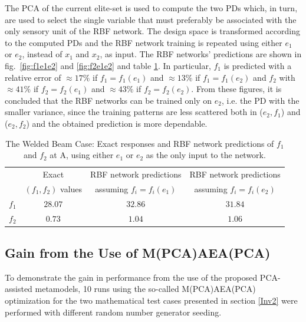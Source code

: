 The PCA of the current elite-set is used to compute the two PDs which, in turn, are used to select the single variable that must preferably be associated with the only sensory unit of the RBF network. The design space is transformed according to the computed PDs and the RBF network training is repeated using either $e_1$ or $e_2$, instead of $x_1$ and $x_2$, as input. 
The RBF networks' predictions are shown in fig.\ \ref{fig:f1e1e2} and \ref{fig:f2e1e2} and table \ref{tab:f1f2e1e2}. 
In particular, $f_1$ is predicted with a relative error of $\approx \! 17\%$ if $f_1\!=\!f_1(e_1)$ and $\approx \! 13\%$ if $f_1\!=\!f_1(e_2)$ and $f_2$ with $\approx \! 41\%$ if $f_2\!=\!f_2(e_1)$ and $\approx \! 43\%$ if $f_2\!=\!f_2(e_2)$. From these figures, it is concluded that the RBF networks can be trained only on $e_2$, i.e. the PD with the smaller variance, since the training patterns are less scattered both in ($e_2,f_1$) and ($e_2,f_2$) and the obtained prediction is more dependable.




\begin{table}[h!]
\begin{center}
\begin{tabular}{c  c | c | c}
		&      Exact  	 		&  RBF network predictions    &  RBF network  predictions   \\
		&  $(f_1,f_2)$ values   &  assuming $f_i=f_i(e_1)$    &   assuming $f_i=f_i(e_2)$  \\
		\hline
$f_1$	& $28.07$   &      $32.86$     &      $31.84$        \\
$f_2$	& $0.73$     &      $ 1.04$     &       $ 1.06$        \\
\end{tabular}
\end{center}
\caption{The Welded Beam Case: Exact responses and RBF network predictions of $f_1$ and $f_2$ at A, using either $e_1$ or $e_2$ as the only input to the network.}
\label{tab:f1f2e1e2}
\end{table}


\subsection{Gain from the Use of M(PCA)AEA(PCA)}

To demonstrate the gain in performance from the use of the proposed PCA-assisted metamodels, 10 runs using the so-called M(PCA)AEA(PCA) optimization for the two mathematical test cases presented in section \ref{Inv2} were performed with different random number generator seeding.  

